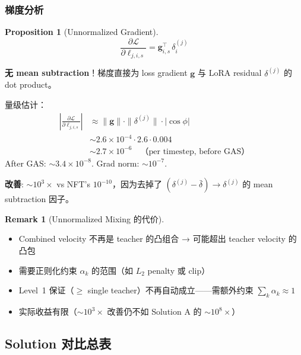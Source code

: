 \documentclass[11pt,a4paper]{article}
\newcommand{\loss}{\mathcal{L}}
\theoremstyle{definition}
\newtheorem{remark}{Remark}
\newtheorem{proposition}{Proposition}
\begin{document}
\subsubsection{梯度分析}

\begin{proposition}[Unnormalized Gradient]
\begin{equation}
\boxed{
\frac{\partial \loss}{\partial \ell_{j,i,s}} = \mathbf{g}_{i,s}^\top\, \delta^{(j)}_i
}
\label{eq:unnorm_gradient}
\end{equation}

\textbf{无 mean subtraction}！梯度直接为 loss gradient $\mathbf{g}$ 与 LoRA residual $\delta^{(j)}$ 的 dot product。

量级估计：
\begin{align}
\left|\frac{\partial \loss}{\partial \ell_{j,i,s}}\right| &\approx \|\mathbf{g}\| \cdot \|\delta^{(j)}\| \cdot |\cos\phi| \\
&\sim 2.6 \times 10^{-4} \cdot 2.6 \cdot 0.004 \\
&\sim 2.7 \times 10^{-6} \quad\text{（per timestep, before GAS）}
\end{align}
After GAS: $\sim 3.4 \times 10^{-8}$. Grad norm: $\sim 10^{-7}$.

\textbf{改善}: $\sim 10^3\times$ vs NFT's $10^{-10}$，因为去掉了 $(\delta^{(j)} - \bar{\delta}) \to \delta^{(j)}$ 的 mean subtraction 因子。
\end{proposition}

\begin{remark}[Unnormalized Mixing 的代价]
\begin{itemize}[leftmargin=1em]
\item Combined velocity 不再是 teacher 的凸组合 → 可能超出 teacher velocity 的凸包
\item 需要正则化约束 $\alpha_k$ 的范围（如 $L_2$ penalty 或 clip）
\item Level~1 保证（$\geq$ single teacher）不再自动成立——需额外约束 $\sum_k \alpha_k \approx 1$
\item 实际收益有限（$\sim 10^{3}\times$ 改善仍不如 Solution A 的 $\sim 10^{8}\times$）
\end{itemize}
\end{remark}

\subsection{Solution 对比总表}
\end{document}
